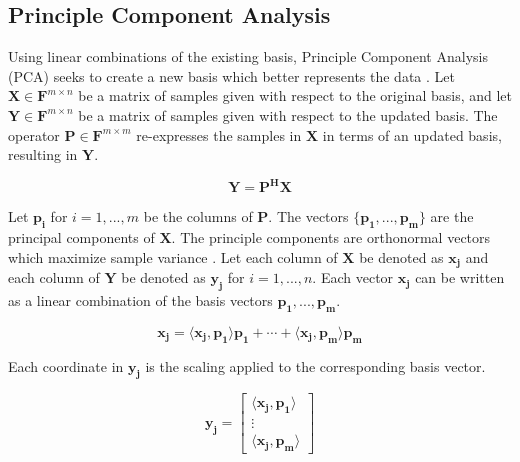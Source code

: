 \documentclass[conference]{IEEEtran}
\begin{document}
    \subsection{Principle Component Analysis} \label{pca_section}
    
    Using linear combinations of the existing basis, Principle Component Analysis (PCA) seeks to create a new basis which better represents the data \cite{shlens_2014_tutorial}. Let $\mathbf{X} \in \mathbf{F}^{m \times n}$ be a matrix of samples given with respect to the original basis, and let $\mathbf{Y} \in \mathbf{F}^{m \times n}$ be a matrix of samples given with respect to the updated basis. The operator $\mathbf{P} \in \mathbf{F}^{m \times m}$ re-expresses the samples in $\mathbf{X}$ in terms of an updated basis, resulting in $\mathbf{Y}$.
    
    \begin{equation}
    		\mathbf{Y} = \mathbf{P^{H}X}
    \end{equation}
    
    Let $\mathbf{p_i}$ for $i = 1,...,m$ be the columns of $\mathbf{P}$. The vectors $\{\mathbf{p_1},...,\mathbf{p_m}\}$ are the principal components of $\mathbf{X}$. The principle components are orthonormal vectors which maximize sample variance \cite{shlens_2014_tutorial}. Let each column of $\mathbf{X}$ be denoted as $\mathbf{x_j}$ and each column of $\mathbf{Y}$ be denoted as $\mathbf{y_j}$ for $i = 1,...,n$. Each vector $\mathbf{x_j}$ can be written as a linear combination of the basis vectors $\mathbf{p_1},...,\mathbf{p_m}$.
    
    \begin{equation}
        \mathbf{x_j} = \langle \mathbf{x_j}, \mathbf{p_1}\rangle \mathbf{p_1} + \cdots + \langle \mathbf{x_j}, \mathbf{p_m}\rangle \mathbf{p_m}
    \end{equation}
    	
    Each coordinate in $\mathbf{y_j}$ is the scaling applied to the corresponding basis vector.
    	
    \begin{equation}
        \mathbf{y_j} = \begin{bmatrix}
                        \langle \mathbf{x_j}, \mathbf{p_1} \rangle\\
                        \vdots \\
                        \langle \mathbf{x_j}, \mathbf{p_m}\rangle
                        \end{bmatrix}
    \end{equation}
    	
\end{document}
